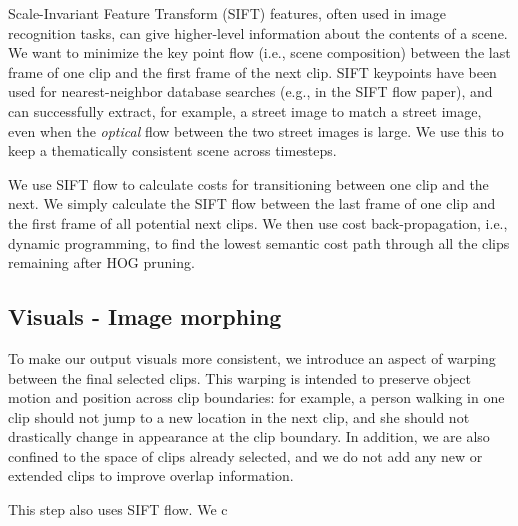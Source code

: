 Scale-Invariant Feature Transform (SIFT) features, often used in image recognition tasks, can give higher-level information about the contents of a scene.  We want to minimize the key point flow (i.e., scene composition) between the last frame of one clip and the first frame of the next clip.  SIFT keypoints have been used for nearest-neighbor database searches (e.g., in the SIFT flow paper), and can successfully extract, for example, a street image to match a street image, even when the \emph{optical} flow between the two street images is large.  We use this to keep a thematically consistent scene across timesteps.

We use SIFT flow to calculate costs for transitioning between one clip and the next.  We simply calculate the SIFT flow between the last frame of one clip and the first frame of all potential next clips.  We then use cost back-propagation, i.e., dynamic programming, to find the lowest semantic cost path through all the clips remaining after HOG pruning.

\subsection{Visuals - Image morphing}

To make our output visuals more consistent, we introduce an aspect of warping between the final selected clips.  This warping is intended to preserve object motion and position across clip boundaries: for example, a person walking in one clip should not jump to a new location in the next clip, and she should not drastically change in appearance at the clip boundary.  In addition, we are also confined to the space of clips already selected, and we do not add any new or extended clips to improve overlap information.

This step also uses SIFT flow.  We c